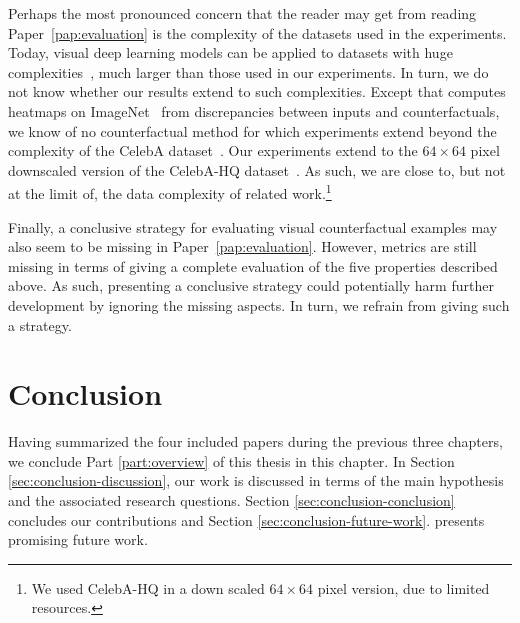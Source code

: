 \documentclass[11pt,a4paper,twoside,openright,final]{memoir}
\newcommand*{\paperref}[1]{Paper~\hyperref[#1]{\ref{#1}}}
\begin{document}
Perhaps the most pronounced concern that the reader may get from reading \paperref{pap:evaluation} is the complexity of the datasets used in the experiments. 
Today, visual deep learning models can be applied to datasets with huge complexities~\cite{biggan, vit}, much larger than those used in our experiments.
In turn, we do not know whether our results extend to such complexities.
Except \cite{Elliott_2021_CVPR} that computes heatmaps on ImageNet~\cite{imagenet} from discrepancies between inputs and counterfactuals, we know of no counterfactual method for which experiments extend beyond the complexity of the CelebA dataset~\cite{celeba}.
Our experiments extend to the $64\times 64$ pixel downscaled version of the CelebA-HQ dataset~\cite{celeba-hq}. 
As such, we are close to, but not at the limit of, the data complexity of related work.\footnote{We used CelebA-HQ in a down scaled $64\times 64$ pixel version, due to limited resources.}

Finally, a conclusive strategy for evaluating visual counterfactual examples may also seem to be missing in \paperref{pap:evaluation}. 
However, metrics are still missing in terms of giving a complete evaluation of the five properties described above.
As such, presenting a conclusive strategy could potentially harm further development by ignoring the missing aspects. 
In turn, we refrain from giving such a strategy. 

%
    
\chapter{Conclusion} 
Having summarized the four included papers during the previous three chapters, we conclude Part \ref{part:overview} of this thesis in this chapter.
In Section \ref{sec:conclusion-discussion}, our work is discussed in terms of the main hypothesis and the associated research questions. 
Section \ref{sec:conclusion-conclusion} concludes our contributions and Section \ref{sec:conclusion-future-work}. 
presents promising future work. 
\end{document}
